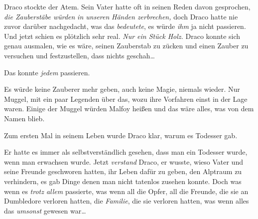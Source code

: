 Draco stockte der Atem. Sein Vater hatte oft in seinen Reden davon gesprochen, \emph{die Zauberstäbe würden} \emph{in unseren} \emph{Händen zerbrechen,} doch Draco hatte nie zuvor darüber nachgedacht, was das \emph{bedeutete}, es würde \emph{ihm} ja nicht passieren. Und jetzt schien es plötzlich sehr real. \emph{Nur ein Stück Holz.} Draco konnte sich genau ausmalen, wie es wäre, seinen Zauberstab zu zücken und einen Zauber zu versuchen und festzustellen, dass nichts geschah…

Das konnte \emph{jedem} passieren.

Es würde keine Zauberer mehr geben, auch keine Magie, niemals wieder. Nur Muggel, mit ein paar Legenden über das, wozu ihre Vorfahren einst in der Lage waren. Einige der Muggel würden Malfoy heißen und das wäre alles, was von dem Namen blieb.

Zum ersten Mal in seinem Leben wurde Draco klar, warum es Todesser gab.

Er hatte es immer als selbstverständlich gesehen, dass man ein Todesser wurde, wenn man erwachsen wurde. Jetzt \emph{verstand} Draco, er wusste, wieso Vater und seine Freunde geschworen hatten, ihr Leben dafür zu geben, den Alptraum zu verhindern, es gab Dinge denen man nicht tatenlos zusehen konnte. Doch was wenn es \emph{trotz allem} passierte, was wenn all die Opfer, all die Freunde, die sie an Dumbledore verloren hatten, die \emph{Familie}, die sie verloren hatten, was wenn alles das \emph{umsonst} gewesen war…

